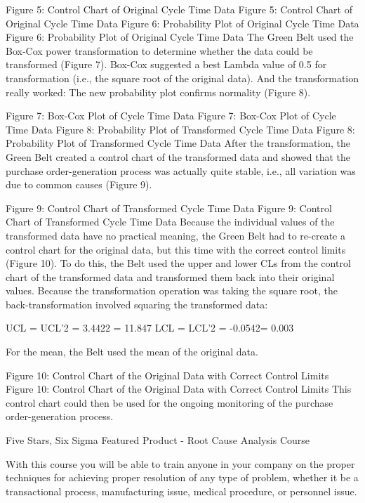 Figure 5: Control Chart of Original Cycle Time Data
Figure 5: Control Chart of Original Cycle Time Data
Figure 6: Probability Plot of Original Cycle Time Data
Figure 6: Probability Plot of Original Cycle Time Data
The Green Belt used the Box-Cox power transformation to determine whether the data could be transformed (Figure 7). Box-Cox suggested a best Lambda value of 0.5 for transformation (i.e., the square root of the original data). And the transformation really worked: The new probability plot confirms normality (Figure 8).

Figure 7: Box-Cox Plot of Cycle Time Data
Figure 7: Box-Cox Plot of Cycle Time Data
Figure 8: Probability Plot of Transformed Cycle Time Data
Figure 8: Probability Plot of Transformed Cycle Time Data
After the transformation, the Green Belt created a control chart of the transformed data and showed that the purchase order-generation process was actually quite stable, i.e., all variation was due to common causes (Figure 9).

Figure 9: Control Chart of Transformed Cycle Time Data
Figure 9: Control Chart of Transformed Cycle Time Data
Because the individual values of the transformed data have no practical meaning, the Green Belt had to re-create a control chart for the original data, but this time with the correct control limits (Figure 10). To do this, the Belt used the upper and lower CLs from the control chart of the transformed data and transformed them back into their original values. Because the transformation operation was taking the square root, the back-transformation involved squaring the transformed data: 

UCL = UCL’2 = 3.4422 = 11.847
LCL = LCL’2 = -0.0542= 0.003

For the mean, the Belt used the mean of the original data.

Figure 10: Control Chart of the Original Data with Correct Control Limits
Figure 10: Control Chart of the Original Data with Correct Control Limits
This control chart could then be used for the ongoing monitoring of the purchase order-generation process.

Five Stars, Six Sigma
Featured Product - Root Cause Analysis Course

With this course you will be able to train anyone in your company on the proper techniques for achieving proper resolution of any type of problem, whether it be a transactional process, manufacturing issue, medical procedure, or personnel issue.
